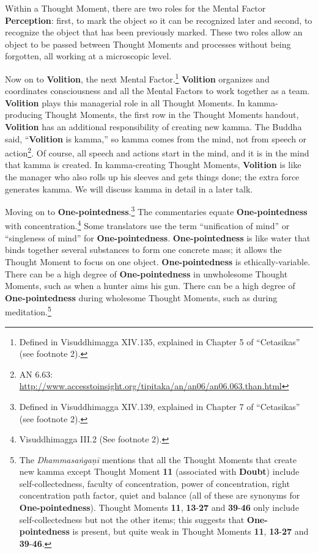 Within a Thought Moment, there are two roles for the Mental Factor \textbf{Perception}: first, to mark the object so it can be recognized later and second, to recognize the object that has been previously marked. These two roles allow an object to be passed between Thought Moments and processes without being forgotten, all working at a microscopic level.

Now on to \textbf{Volition}, the next Mental Factor.\footnote{Defined in Visuddhimagga XIV.135, explained in Chapter 5 of “Cetasikas” (see footnote 2).} \textbf{Volition} organizes and coordinates consciousness and all the Mental Factors to work together as a team. \textbf{Volition} plays this managerial role in all Thought Moments. In kamma-producing Thought Moments, the first row in the Thought Moments handout, \textbf{Volition} has an additional responsibility of creating new kamma. The Buddha said, “\textbf{Volition} is kamma,” so kamma comes from the mind, not from speech or action\footnote{AN 6.63: \url{http://www.accesstoinsight.org/tipitaka/an/an06/an06.063.than.html}}. Of course, all speech and actions start in the mind, and it is in the mind that kamma is created. In kamma-creating Thought Moments, \textbf{Volition} is like the manager who also rolls up his sleeves and gets things done; the extra force generates kamma. We will discuss kamma in detail in a later talk.

Moving on to \textbf{One-pointedness}.\footnote{Defined in Visuddhimagga XIV.139, explained in Chapter 7 of “Cetasikas” (see footnote 2).} The commentaries equate \textbf{One-pointedness} with concentration.\footnote{Visuddhimagga III.2 (See footnote 2).} Some translators use the term “unification of mind” or “singleness of mind” for \textbf{One-pointedness}. \textbf{One-pointedness} is like water that binds together several substances to form one concrete mass; it allows the Thought Moment to focus on one object. \textbf{One-pointedness} is ethically-variable. There can be a high degree of \textbf{One-pointedness} in unwholesome Thought Moments, such as when a hunter aims his gun. There can be a high degree of \textbf{One-pointedness} during wholesome Thought Moments, such as during meditation.\footnote{The \textit{Dhammasaṅgaṇī} mentions that all the Thought Moments that create new kamma except Thought Moment \textbf{11} (associated with \textbf{Doubt}) include self-collectedness, faculty of concentration, power of concentration, right concentration path factor, quiet and balance (all of these are synonyms for \textbf{One-pointedness}). Thought Moments \textbf{11}, \textbf{13}-\textbf{27} and \textbf{39}-\textbf{46} only include self-collectedness but not the other items; this suggests that \textbf{One-pointedness} is present, but quite weak in Thought Moments \textbf{11}, \textbf{13}-\textbf{27} and \textbf{39}-\textbf{46}.}

